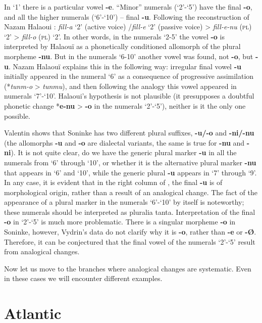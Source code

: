 In ‘1’ there is a particular vowel \textbf{-e}. “Minor” numerals (‘2’-‘5’) have the final \textbf{-o}, and all the higher numerals (‘6’-‘10’) – final \textbf{-u}.  Following the reconstruction of Nazam Halaoui \citep{Halaouï1990}: \textit{fill-a} ‘2’ (active voice) /\textit{fill-e} ‘2’ (passive voice) > \textit{fill-e-nu} (\textsc{pl})  ‘2’ > \textit{fill-o} (\textsc{pl}) ‘2’. In other words, in the numerals ‘2-5’ the vowel \textbf{-o} is interpreted by Halaouï as a phonetically conditioned allomorph of the plural morpheme \textbf{-nu}. But in the numerals ‘6-10’ another vowel was found, not \textbf{-o}, but \textbf{-u}. Nazam Halaouï explains this in the following way: irregular final vowel \textbf{-u} initially appeared in the numeral ‘6’ as a consequence of progressive assimilation (*\textit{tunm-o} > \textit{tunmu}), and then following the analogy this vowel appeared in numerals ‘7’-‘10’. Halaoui’s hypothesis is not plausible (it presupposes a doubtful phonetic change *\textbf{e-nu} > \textbf{-o} in the numerals ‘2’-‘5’), neither is it the only one possible. 

Valentin \citet[171-204]{Vydrin2006} shows that Soninke has two different plural suffixes, \textbf{-u/-o} and \textbf{-ni/-nu} (the allomorphs \textbf{-u} and \textbf{-o} are dialectal variants, the same is true for \textbf{-nu} and \textbf{-ni}). It is not quite clear, do we have the generic plural marker  \textbf{-u} in all the numerals from ‘6’ through ‘10’, or whether it is the alternative plural marker \textbf{-nu} that appears in ‘6’ and ‘10’, while the generic plural \textbf{-u} appears in ‘7’ through ‘9’. In any case, it is evident that in the right column of , the final \textbf{-u} is of morphological origin, rather than a result of an analogical change. The fact of the appearance of a plural marker in the numerals ‘6’-‘10’ by itself is noteworthy; these numerals should be interpreted as pluralia tanta. Interpretation of the final \textbf{-o} in ‘2’-‘5’ is much more problematic. There is a singular morpheme \textbf{-o} in Soninke, however, Vydrin's data do not clarify why it is \textbf{-o}, rather than \textbf{-e} or \textbf{-Ø}. Therefore, it can be conjectured that the final vowel of the numerals ‘2’-‘5’ result from analogical changes.

Now let us move to the branches where analogical changes are systematic. Even in these cases we will encounter different examples.

 
\section{Atlantic}%

